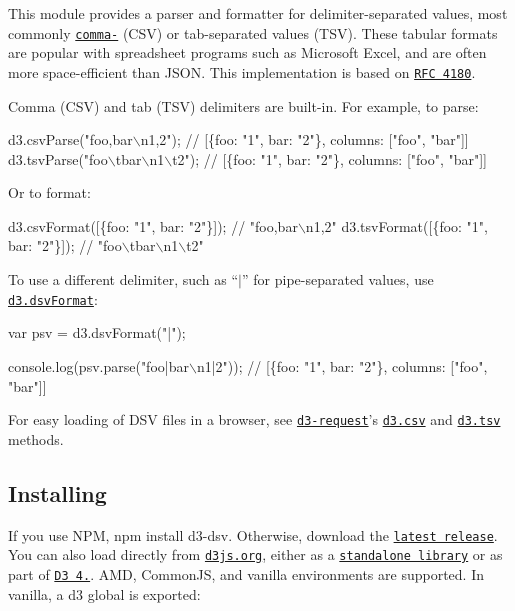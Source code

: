 This module provides a parser and formatter for delimiter-\/separated values, most commonly \href{https://en.wikipedia.org/wiki/Comma-separated_values}{\tt comma-\/} (C\+SV) or tab-\/separated values (T\+SV). These tabular formats are popular with spreadsheet programs such as Microsoft Excel, and are often more space-\/efficient than J\+S\+ON. This implementation is based on \href{http://tools.ietf.org/html/rfc4180}{\tt R\+FC 4180}.

Comma (C\+SV) and tab (T\+SV) delimiters are built-\/in. For example, to parse\+:


\begin{DoxyCode}
d3.csvParse("foo,bar\(\backslash\)n1,2"); // [\{foo: "1", bar: "2"\}, columns: ["foo", "bar"]]
d3.tsvParse("foo\(\backslash\)tbar\(\backslash\)n1\(\backslash\)t2"); // [\{foo: "1", bar: "2"\}, columns: ["foo", "bar"]]
\end{DoxyCode}


Or to format\+:


\begin{DoxyCode}
d3.csvFormat([\{foo: "1", bar: "2"\}]); // "foo,bar\(\backslash\)n1,2"
d3.tsvFormat([\{foo: "1", bar: "2"\}]); // "foo\(\backslash\)tbar\(\backslash\)n1\(\backslash\)t2"
\end{DoxyCode}


To use a different delimiter, such as “$\vert$” for pipe-\/separated values, use \href{#dsvFormat}{\tt d3.\+dsv\+Format}\+:


\begin{DoxyCode}
var psv = d3.dsvFormat("|");

console.log(psv.parse("foo|bar\(\backslash\)n1|2")); // [\{foo: "1", bar: "2"\}, columns: ["foo", "bar"]]
\end{DoxyCode}


For easy loading of D\+SV files in a browser, see \href{https://github.com/d3/d3-request}{\tt d3-\/request}’s \href{https://github.com/d3/d3-request#csv}{\tt d3.\+csv} and \href{https://github.com/d3/d3-request#tsv}{\tt d3.\+tsv} methods.

\subsection*{Installing}

If you use N\+PM, {\ttfamily npm install d3-\/dsv}. Otherwise, download the \href{https://github.com/d3/d3-dsv/releases/latest}{\tt latest release}. You can also load directly from \href{https://d3js.org}{\tt d3js.\+org}, either as a \href{https://d3js.org/d3-dsv.v1.min.js}{\tt standalone library} or as part of \href{https://github.com/d3/d3}{\tt D3 4.}. A\+MD, Common\+JS, and vanilla environments are supported. In vanilla, a {\ttfamily d3} global is exported\+:


